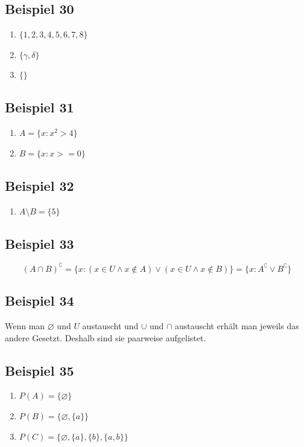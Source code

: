 \documentclass[12pt, a4paper, oneside]{article}
\begin{document}
\subsection{Beispiel 30}
\begin{enumerate}
  \item $\{1, 2, 3, 4, 5, 6, 7, 8\}$
  \item $\{\gamma, \delta\}$
  \item $\{\}$
\end{enumerate}

\subsection{Beispiel 31}
\begin{enumerate}[$\bullet$]
  \item $A = \{x : x^{2} > 4\}$
  \item $B = \{x: x >= 0\}$
\end{enumerate}

\subsection{Beispiel 32}
\begin{enumerate}[$\bullet$]
  \item $A \setminus B = \{5\}$
\end{enumerate}

\subsection{Beispiel 33}
\begin{equation*}
  (A \cap B)^{\complement} = \{x : (x \in U \land x \notin A) \lor (x \in U \land x \notin B)\} = \{x : A^{\complement} \lor B^{\complement}\}
\end{equation*}

\subsection{Beispiel 34}
Wenn man $\varnothing$ und $U$ austauscht und $\cup$ und $\cap$ austauscht erhält man jeweils das andere Gesetzt. Deshalb sind sie paarweise aufgelistet. 

\subsection{Beispiel 35} 
\begin{enumerate}[$\bullet$]
  \item $P(A) = \{\varnothing\}$
  \item $P(B) = \{\varnothing,\{a\} \}$
  \item $P(C) = \{\varnothing, \{a\}, \{b\}, \{a, b\}\}$
\end{enumerate}
\end{document}

